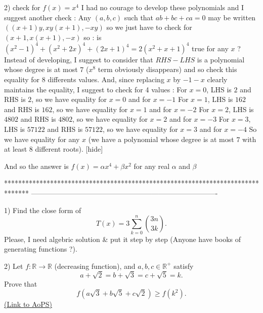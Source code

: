 \begin{solution}
2) check for $ f(x) = x^4$
I had no courage to develop these polynomials and I suggest another check :
Any $ (a,b,c)$ such that $ ab + bc + ca = 0$ may be written $ ((x + 1)y,xy(x + 1), - xy)$ so we just have to check for $ (x + 1,x(x + 1), - x)$ so :
is $ (x^2 - 1)^4 + (x^2 + 2x)^4 + (2x + 1)^4 = 2(x^2 + x + 1)^4$ true for any $ x$ ?
Instead of developing, I suggest to consider that $ RHS - LHS$ is a polynomial whose degree is at most $ 7$ ($ x^8$ term obviously disappears) and so check this equality for 8 differents values. And, since replacing $ x$ by $ - 1 - x$ clearly maintains the equality, I suggest to check for 4 values :
For $ x = 0$, LHS is $ 2$ and RHS is $ 2$, so we have equality for $ x = 0$ and for $ x = - 1$
For $ x = 1$, LHS is $ 162$ and RHS is $ 162$, so we have equality for $ x = 1$ and for $ x = - 2$
For $ x = 2$, LHS is $ 4802$ and RHS is $ 4802$, so we have equality for $ x = 2$ and for $ x = - 3$
For $ x = 3$, LHS is $ 57122$ and RHS is $ 57122$, so we have equality for $ x = 3$ and for $ x = - 4$
So we have equality for any $ x$ (we have a polynomial whose degree is at most $ 7$ with at least $ 8$ different roots).
[\/hide]

And so the answer is $ \boxed{f(x) = \alpha x^4 + \beta x^2}$ for any real $ \alpha$ and $ \beta$
\end{solution}



*******************************************************************************
-------------------------------------------------------------------------------

\begin{problem}
	1) Find the close form of
\[ T(x) = 3 \sum_{k = 0}^{n} \binom{3n}{3k}.
\]
Please, I need algebric solution & put it step by step (Anyone have books of generating functions ?).

2) Let $ f: \mathbb{R} \to \mathbb{R}$ (decreasing function), and $ a,b,c \in \mathbb{R}^ +$ satisfy
\[ a + \sqrt 2 = b + \sqrt 3 = c + \sqrt 5 = k.
\]
Prove that
\[ f\left(a\sqrt 3 + b\sqrt 5 + c\sqrt 2 \right) \ge f(k^2).
\]
	\flushright \href{https://artofproblemsolving.com/community/c6h277283}{(Link to AoPS)}
\end{problem}



